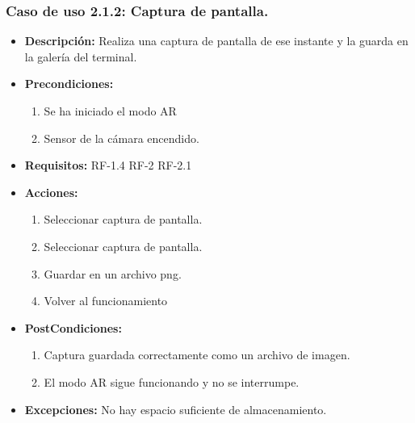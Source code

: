 \subsubsection{Caso de uso 2.1.2: Captura de pantalla. }
 \begin{itemize}
 	\item \textbf{Descripción:} Realiza una captura de pantalla de ese instante y la guarda en la galería del terminal.
 	\item \textbf{Precondiciones:}
	 		\begin{enumerate}
	 		\item Se ha iniciado el modo AR
	 		\item Sensor de la cámara encendido.
	 		
	 	\end{enumerate}
 	\item \textbf{Requisitos:} RF-1.4 RF-2 RF-2.1
 	\item \textbf{Acciones:}
	 	\begin{enumerate}
	 		\item Seleccionar captura de pantalla.
	 		\item Seleccionar captura de pantalla.
	 		\item Guardar en un archivo png.
	 		\item Volver al funcionamiento
	 	\end{enumerate}
 	
 	\item \textbf{PostCondiciones:}
	 	\begin{enumerate}
	 		\item Captura guardada correctamente como un archivo de imagen.
	 		\item El modo AR sigue funcionando y no se interrumpe.
	 		
	 	\end{enumerate}
 
 	\item \textbf{Excepciones:}  No hay espacio suficiente de almacenamiento.
 \end{itemize}

